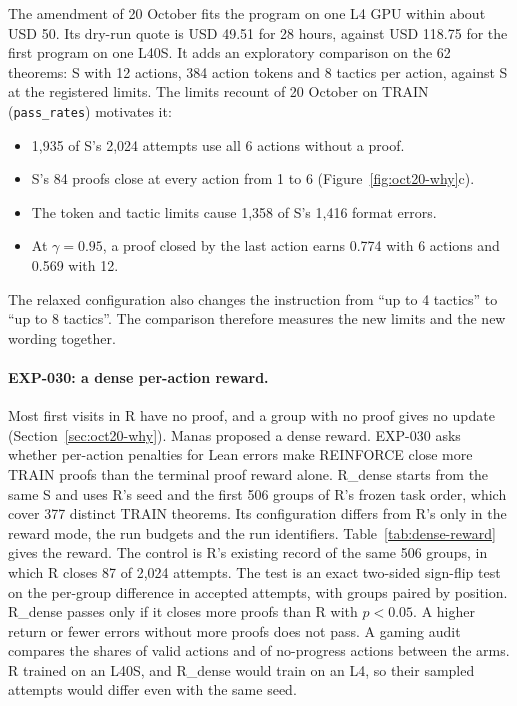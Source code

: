 \documentclass[11pt]{article}
\newcommand{\code}[1]{\texttt{#1}}
\begin{document}
The amendment of 20 October fits the program on one L4 GPU within about USD 50.
Its dry-run quote is USD 49.51 for 28 hours, against USD 118.75 for the first program on one L40S.
It adds an exploratory comparison on the 62 theorems: S with 12 actions, 384 action tokens and 8 tactics per action, against S at the registered limits.
The limits recount of 20 October on TRAIN (\code{pass\_rates}) motivates it:
\begin{itemize}
\item 1,935 of S's 2,024 attempts use all 6 actions without a proof.
\item S's 84 proofs close at every action from 1 to 6 (Figure~\ref{fig:oct20-why}c).
\item The token and tactic limits cause 1,358 of S's 1,416 format errors.
\item At $\gamma = 0.95$, a proof closed by the last action earns 0.774 with 6 actions and 0.569 with 12.
\end{itemize}
The relaxed configuration also changes the instruction from ``up to 4 tactics'' to ``up to 8 tactics''.
The comparison therefore measures the new limits and the new wording together.

\paragraph{EXP-030: a dense per-action reward.}
Most first visits in R have no proof, and a group with no proof gives no update (Section~\ref{sec:oct20-why}).
Manas proposed a dense reward.
EXP-030 asks whether per-action penalties for Lean errors make REINFORCE close more TRAIN proofs than the terminal proof reward alone.
R\_dense starts from the same S and uses R's seed and the first 506 groups of R's frozen task order, which cover 377 distinct TRAIN theorems.
Its configuration differs from R's only in the reward mode, the run budgets and the run identifiers.
Table~\ref{tab:dense-reward} gives the reward.
The control is R's existing record of the same 506 groups, in which R closes 87 of 2,024 attempts.
The test is an exact two-sided sign-flip test on the per-group difference in accepted attempts, with groups paired by position.
R\_dense passes only if it closes more proofs than R with $p < 0.05$.
A higher return or fewer errors without more proofs does not pass.
A gaming audit compares the shares of valid actions and of no-progress actions between the arms.
R trained on an L40S, and R\_dense would train on an L4, so their sampled attempts would differ even with the same seed.
\end{document}
